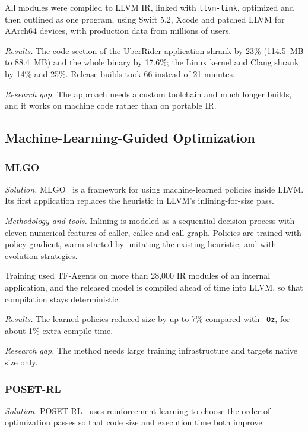 \documentclass{ieeeaccess}
\begin{document}
All modules were compiled to LLVM IR, linked with \texttt{llvm-link}, optimized and then outlined as one program, using Swift 5.2, Xcode and patched LLVM for AArch64 devices, with production data from millions of users.

\textit{Results.} The code section of the UberRider application shrank by 23\% (114.5~MB to 88.4~MB) and the whole binary by 17.6\%; the Linux kernel and Clang shrank by 14\% and 25\%. Release builds took 66 instead of 21 minutes.

\textit{Research gap.} The approach needs a custom toolchain and much longer builds, and it works on machine code rather than on portable IR.

\subsection{Machine-Learning-Guided Optimization}

\subsubsection{MLGO}
\textit{Solution.} MLGO~\cite{trofin2021mlgo} is a framework for using machine-learned policies inside LLVM. Its first application replaces the heuristic in LLVM's inlining-for-size pass.

\textit{Methodology and tools.} Inlining is modeled as a sequential decision process with eleven numerical features of caller, callee and call graph. Policies are trained with policy gradient, warm-started by imitating the existing heuristic, and with evolution strategies.

Training used TF-Agents on more than 28,000 IR modules of an internal application, and the released model is compiled ahead of time into LLVM, so that compilation stays deterministic.

\textit{Results.} The learned policies reduced size by up to 7\% compared with \texttt{-Oz}, for about 1\% extra compile time.

\textit{Research gap.} The method needs large training infrastructure and targets native size only.

\subsubsection{POSET-RL}
\textit{Solution.} POSET-RL~\cite{jain2022posetrl} uses reinforcement learning to choose the order of optimization passes so that code size and execution time both improve.
\end{document}
